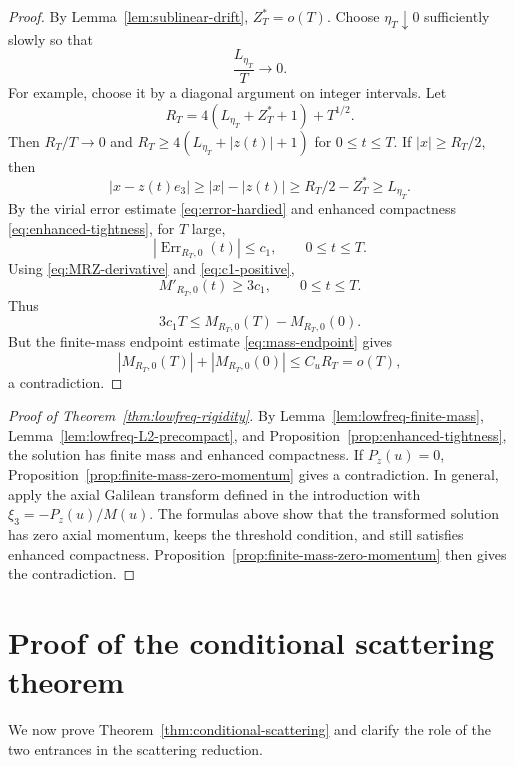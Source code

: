 \documentclass[preprint,12pt]{elsarticle}
\numberwithin{equation}{section}
\newcommand{\ez}{e_3}
\newcommand{\Err}{\operatorname{Err}}
\theoremstyle{remark}
\begin{document}
\begin{proof}
By Lemma~\ref{lem:sublinear-drift}, $Z_T^*=o(T)$.  Choose $\eta_T\downarrow0$ sufficiently slowly so that
\[
  \frac{L_{\eta_T}}{T}\to0.
\]
For example, choose it by a diagonal argument on integer intervals.  Let
\[
  R_T=4(L_{\eta_T}+Z_T^*+1)+T^{1/2}.
\]
Then $R_T/T\to0$ and $R_T\ge4(L_{\eta_T}+|z(t)|+1)$ for $0\le t\le T$.  If $|x|\ge R_T/2$, then
\[
  |x-z(t)\ez|\ge |x|-|z(t)|\ge R_T/2-Z_T^*\ge L_{\eta_T}.
\]
By the virial error estimate \eqref{eq:error-hardied} and enhanced compactness \eqref{eq:enhanced-tightness}, for $T$ large,
\[
  |\Err_{R_T,0}(t)|\le c_1,
  \qquad 0\le t\le T.
\]
Using \eqref{eq:MRZ-derivative} and \eqref{eq:c1-positive},
\[
  M'_{R_T,0}(t)\ge3c_1,
  \qquad 0\le t\le T.
\]
Thus
\[
  3c_1T\le M_{R_T,0}(T)-M_{R_T,0}(0).
\]
But the finite-mass endpoint estimate \eqref{eq:mass-endpoint} gives
\[
  |M_{R_T,0}(T)|+|M_{R_T,0}(0)|\le C_uR_T=o(T),
\]
a contradiction.
\end{proof}

\begin{proof}[Proof of Theorem~\ref{thm:lowfreq-rigidity}]
By Lemma~\ref{lem:lowfreq-finite-mass}, Lemma~\ref{lem:lowfreq-L2-precompact}, and Proposition~\ref{prop:enhanced-tightness}, the solution has finite mass and enhanced compactness.  If $P_z(u)=0$, Proposition~\ref{prop:finite-mass-zero-momentum} gives a contradiction.  In general, apply the axial Galilean transform defined in the introduction with $\xi_3=-P_z(u)/M(u)$.  The formulas above show that the transformed solution has zero axial momentum, keeps the threshold condition, and still satisfies enhanced compactness.  Proposition~\ref{prop:finite-mass-zero-momentum} then gives the contradiction.
\end{proof}

\section{Proof of the conditional scattering theorem}\label{sec:scattering}

We now prove Theorem~\ref{thm:conditional-scattering} and clarify the role of the two entrances in the scattering reduction.
\end{document}
